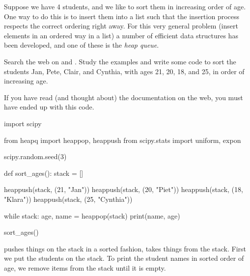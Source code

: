 Suppose we have 4 students, and we like to sort them in increasing order of age.
One way to do this is to insert them into a list such that the insertion process respects the correct ordering right away.
For this very general problem (insert elements in an ordered way in a list) a number of efficient data structures has been developed, and one of these is the \emph{heap queue}.

\begin{exercise}
  Search the web on  and .
  Study the examples and write some code to sort the students Jan, Pete, Clair, and Cynthia, with ages 21, 20, 18, and 25, in order of increasing age.

\begin{solution}
  If you have read (and thought about) the documentation on the web, you must have ended up with this code.
\begin{pyverbatim}
import scipy

from heapq import heappop, heappush
from scipy.stats import uniform, expon

scipy.random.seed(3)


def sort_ages():
    stack = []

    heappush(stack, (21, "Jan"))
    heappush(stack, (20, "Piet"))
    heappush(stack, (18, "Klara"))
    heappush(stack, (25, "Cynthia"))

    while stack:
        age, name = heappop(stack)
        print(name, age)


sort_ages()
  \end{pyverbatim}

   pushes things on the stack in a sorted fashion,  takes things from the stack.
  First we put the students on the stack.
  To print the student names in sorted order of age, we remove items from the stack until it is empty.
\end{solution}

\end{exercise}



